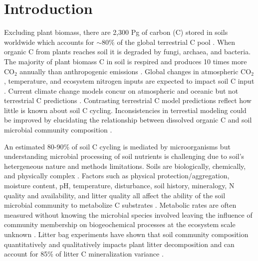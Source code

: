\section{Introduction}
Excluding plant biomass, there are 2,300 Pg of carbon (C) stored in soils
worldwide which accounts for $\sim$80\% of the global terrestrial C pool
\citep{Amundson_2001,BATJES_1996}. When organic C from plants reaches soil it
is degraded by fungi, archaea, and bacteria.  The majority of plant biomass
C in soil is respired and produces 10 times more CO$_{2}$ annually than
anthropogenic emissions \citep{chapin2002principles}. Global
changes in atmospheric CO$_{2}$, temperature, and ecosystem nitrogen inputs are
expected to impact soil C input \citep{Groenigen_2006}. Current climate change
models concur on atmospheric and oceanic but not terrestrial C predictions
\citep{Friedlingstein_2006}. Contrasting terrestrial C model predictions
reflect how little is known about soil C cycling. Inconsistencies in
terrestial modeling could be improved by elucidating the relationship between
dissolved organic C and soil microbial community composition \citep{Neff_2001}.

An estimated 80-90\% of soil C cycling is mediated by microorganisms
\citep{ColemanCrossley_1996,Nannipieri_2003} but understanding microbial
processing of soil nutrients is challenging due to soil's hetergeneous nature
and methods limitations. Soils are biologically, chemically,
and physically complex \citep{Nannipieri_2003}. Factors such as
physical protection/aggregation, moisture content, pH, temperature,
disturbance, soil history, mineralogy, N quality and availability, and litter
quality all affect the ability of the soil microbial
community to metabolize C substrates \citep{Sollins_Homann_Caldwell_1996,
Kalbitz_2000}. Metabolic rates are often measured without knowing
the microbial species involved \citep{ndi_Pietramellara_Renella_2003} leaving
the influence of community membership on biogeochemical processes at the
ecosystem scale unknown \citep{Allison_2008,
ndi_Pietramellara_Renella_2003,Schimel_2012}. Litter bag experiments have shown
that soil community composition quantitatively and qualitatively impacts plant
litter decomposition and can account for 85\% of litter C mineralization
variance \citep{Schimel_1995, Strickland_2009, Wohl_2004}. 

